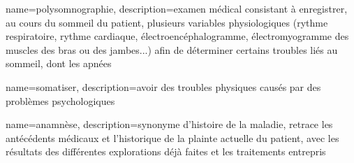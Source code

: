  {
    name=polysomnographie,
    description={examen médical consistant à enregistrer, au cours du sommeil du patient, plusieurs variables physiologiques
      (rythme respiratoire, rythme cardiaque, électroencéphalogramme, électromyogramme des muscles des bras ou des jambes...)
      afin de déterminer certains troubles liés au sommeil, dont les apnées}
}

 {
    name=somatiser,
    description={avoir des troubles physiques causés par des problèmes psychologiques}
}

 {
    name=anamnèse,
    description={synonyme d'histoire de la maladie, retrace les antécédents médicaux et l'historique de la plainte actuelle du patient,
      avec les résultats des différentes explorations déjà faites et les traitements entrepris}
}
